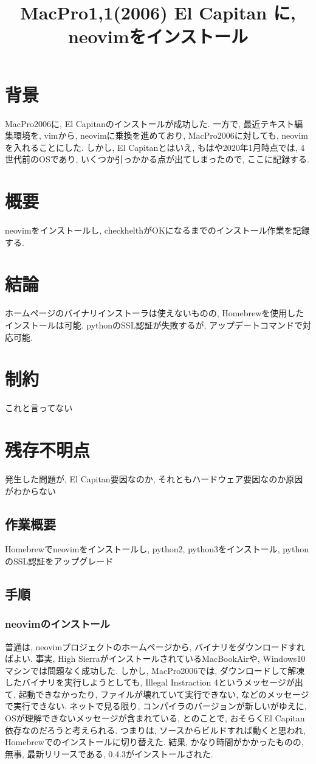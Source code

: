 \documentclass{jsarticle}
\title{MacPro1,1(2006) El Capitan に, neovimをインストール}
\begin{document}
\maketitle

\section{背景}
MacPro2006に, El Capitanのインストールが成功した.
一方で, 最近テキスト編集環境を, vimから, neovimに乗換を進めており, MacPro2006に対しても, neovimを入れることにした. 
しかし, El Capitanとはいえ, もはや2020年1月時点では, 4世代前のOSであり, いくつか引っかかる点が出てしまったので, 
ここに記録する. 

\section{概要}
neovimをインストールし, checkhelthがOKになるまでのインストール作業を記録する. 

\section{結論}
ホームページのバイナリインストーラは使えないものの, Homebrewを使用したインストールは可能. 
pythonのSSL認証が失敗するが, アップデートコマンドで対応可能. 

\section{制約}
これと言ってない

\section{残存不明点}
発生した問題が, El Capitan要因なのか, それともハードウェア要因なのか原因がわからない

\subsection{作業概要}
Homebrewでneovimをインストールし, python2, python3をインストール, pythonのSSL認証をアップグレード

\subsection{手順}
\subsubsection{neovimのインストール}
普通は, neovimプロジェクトのホームページから, バイナリをダウンロードすればよい. 
事実, High SierraがインストールされているMacBookAirや, Windows10マシンでは問題なく成功した. 
しかし, MacPro2006では, ダウンロードして解凍したバイナリを実行しようとしても, Illegal Instraction 4というメッセージが出て, 起動できなかったり, ファイルが壊れていて実行できない, などのメッセージで実行できない. 
ネットで見る限り, コンパイラのバージョンが新しいがゆえに, OSが理解できないメッセージが含まれている, とのことで, おそらくEl Capitan依存なのだろうと考えられる. 
つまりは, ソースからビルドすれば動くと思われ, Homebrewでのインストールに切り替えた. 
結果, かなり時間がかかったものの, 無事, 最新リリースである, 0.4.3がインストールされた. 
\end{document}
